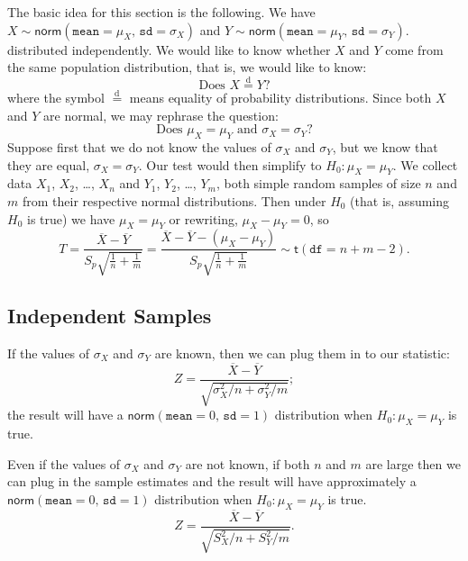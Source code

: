 \documentclass[captions=tableheading]{scrbook}
\begin{document}
The basic idea for this section is the following. We have \(X\sim\mathsf{norm}(\mathtt{mean}=\mu_{X},\,\mathtt{sd}=\sigma_{X})\) and \(Y\sim\mathsf{norm}(\mathtt{mean}=\mu_{Y},\,\mathtt{sd}=\sigma_{Y})\). distributed independently. We would like to know whether \(X\) and \(Y\) come from the same population distribution, that is, we would like to know:
\begin{equation}
\mbox{Does }X\overset{\mathrm{d}}{=}Y?
\end{equation}
where the symbol \(\overset{\mathrm{d}}{=}\) means equality of probability distributions.
Since both \(X\) and \(Y\) are normal, we may rephrase the question:
\begin{equation}
\mbox{Does }\mu_{X}=\mu_{Y}\mbox{ and }\sigma_{X}=\sigma_{Y}?
\end{equation}
Suppose first that we do not know the values of \(\sigma_{X}\) and \(\sigma_{Y}\), but we know that they are equal, \(\sigma_{X}=\sigma_{Y}\). Our test would then simplify to \(H_{0}:\mu_{X}=\mu_{Y}\). We collect data \(X_{1}\), \(X_{2}\), \ldots{}, \(X_{n}\) and \(Y_{1}\), \(Y_{2}\), \ldots{}, \(Y_{m}\), both simple random samples of size \(n\) and \(m\) from their respective normal distributions. Then under \(H_{0}\) (that is, assuming \(H_{0}\) is true) we have \(\mu_{X}=\mu_{Y}\) or rewriting, \(\mu_{X}-\mu_{Y}=0\), so 
\begin{equation}
T=\frac{\overline{X}-\overline{Y}}{S_{p}\sqrt{\frac{1}{n}+\frac{1}{m}}}=\frac{\overline{X}-\overline{Y}-(\mu_{X}-\mu_{Y})}{S_{p}\sqrt{\frac{1}{n}+\frac{1}{m}}}\sim\mathsf{t}(\mathtt{df}=n+m-2).
\end{equation}
\subsection{Independent Samples}
\label{sec-10-3-1}


\begin{rem}
If the values of \(\sigma_{X}\) and \(\sigma_{Y}\) are known, then we can plug them in to our statistic:
\begin{equation} 
Z=\frac{\overline{X}-\overline{Y}}{\sqrt{\sigma_{X}^{2}/n+\sigma_{Y}^{2}/m}};
\end{equation}
the result will have a \(\mathsf{norm}(\mathtt{mean}=0,\,\mathtt{sd}=1)\) distribution when \(H_{0}:\mu_{X}=\mu_{Y}\) is true. 
\end{rem}

\begin{rem}
Even if the values of \(\sigma_{X}\) and \(\sigma_{Y}\) are not known, if both \(n\) and \(m\) are large then we can plug in the sample estimates and the result will have approximately a \(\mathsf{norm}(\mathtt{mean}=0,\,\mathtt{sd}=1)\) distribution when \(H_{0}:\mu_{X}=\mu_{Y}\) is true.
\begin{equation} 
Z=\frac{\overline{X}-\overline{Y}}{\sqrt{S_{X}^{2}/n+S_{Y}^{2}/m}}.
\end{equation}
\end{rem}
\end{document}
